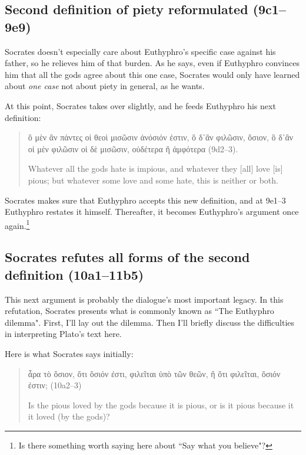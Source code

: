 \documentclass[11pt]{article}
\begin{document}

\subsection{Second definition of piety reformulated (9c1--9e9)}

Socrates doesn't especially care about Euthyphro's specific case against
his father, so he relieves him of that burden.  As he says, even if
Euthyphro convinces him that all the gods agree about this one case,
Socrates would only have learned about \emph{one case} not about piety in
general, as he wants.

At this point, Socrates takes over slightly, and he feeds Euthyphro his
next definition:

\begin{quote}

    {\g
    ὃ μὲν ἂν πάντες οἱ θεοὶ μισῶσιν ἀνόσιόν ἐστιν, ὃ δ᾽ἂν φιλῶσιν, ὅσιον,
    ὃ δ᾽ἂν οἱ μὲν φιλῶσιν οἱ δὲ μισῶσιν, οὐδέτερα ἢ ἀμφότερα
    } (9d2--3).

    Whatever all the gods hate is impious, and whatever they [all] love
    [is] pious; but whatever some love and some hate, this is neither or
    both.

\end{quote}

Socrates makes sure that Euthyphro accepts this new definition, and at
9e1--3 Euthyphro restates it himself.  Thereafter, it becomes Euthyphro's
argument once again.\footnote{Is there something worth saying here about
``Say what you believe"?}


\subsection{Socrates refutes all forms of the second definition (10a1--11b5)}

This next argument is probably the dialogue's most important legacy.  In
this refutation, Socrates presents what is commonly known as ``The Euthyphro
dilemma".  First, I'll lay out the dilemma.  Then I'll briefly discuss the
difficulties in interpreting Plato's text here.

Here is what Socrates says initially:

\begin{quote}

    {\g
    ἆρα τὸ ὅσιον, ὅτι ὅσιόν ἐστι, φιλεῖται ὑπὸ τῶν θεῶν, ἢ ὅτι φιλεῖται,
    ὅσιόν ἐστιν;
    } (10a2--3)

    Is the pious loved by the gods because it is pious, or is it pious
    because it it loved (by the gods)?

\end{quote}
\end{document}
